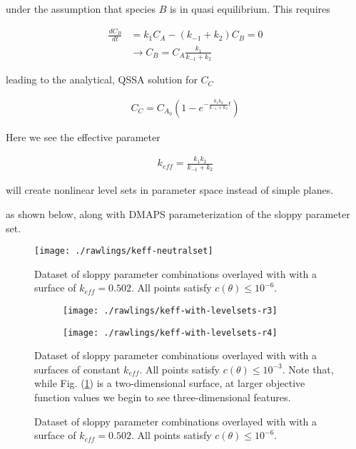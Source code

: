 \documentclass[11pt]{article}
\begin{document}
under the assumption that species $B$ is in quasi equilibrium. This requires

\begin{align*}
  \frac{dC_B}{dt} &= k_1 C_A - (k_{-1} + k_2) C_B = 0 \\
  &\rightarrow C_B = C_A \frac{k_1}{k_{-1} + k_2}
\end{align*}

leading to the analytical, QSSA solution for $C_C$

\begin{align*}
  C_C = C_{A_0}(1 - e^{-\frac{k_1 k_2}{k_{-1} + k_2} t})
\end{align*}

Here we see the effective parameter

\begin{align*}
  k_{eff} = \frac{k_1 k_2}{k_{-1} + k_2}
\end{align*}

will create nonlinear level sets in parameter space instead of simple planes.

as shown below, along with DMAPS parameterization of the sloppy parameter set.

\begin{figure}[htbp]
  \centering
  \texttt{[image: ./rawlings/keff-neutralset]}
  \caption{Dataset of sloppy parameter combinations overlayed with
    with a surface of $k_{eff} =0.502$. All points satisfy $c(\theta)
    \le 10^{-6}$. \label{f.keff-neutralset}}
\end{figure}

\begin{figure}[ht!]
  \begin{subfigure}[t]{0.49\textwidth}
    \centering
    \texttt{[image: ./rawlings/keff-with-levelsets-r3]}
  \end{subfigure}
  \begin{subfigure}[t]{0.49\textwidth}
    \centering
    \texttt{[image: ./rawlings/keff-with-levelsets-r4]}
  \end{subfigure} %
  \caption{Dataset of sloppy parameter combinations overlayed with
    with a surfaces of constant $k_{eff}$. All points satisfy $c(\theta)
    \le 10^{-3}$. Note that, while Fig. (\ref{f.keff-neutralset}) is
    a two-dimensional surface, at larger objective function values we
    begin to see three-dimensional features. \label{f.keff-levelsets}}
\end{figure}


\begin{figure}[htbp]
  \centering
  \caption{Dataset of sloppy parameter combinations overlayed with
    with a surface of $k_{eff} =0.502$. All points satisfy $c(\theta)
    \le 10^{-6}$.}
\end{figure}
\end{document}
